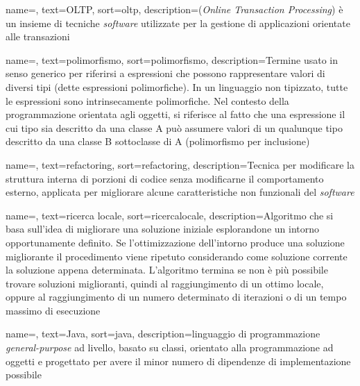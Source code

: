 {
    name=,
    text=OLTP,
    sort=oltp,
    description={(\textit{Online Transaction Processing}) è un insieme di tecniche \textit{software} utilizzate per
    la gestione di applicazioni orientate alle transazioni \cite{siteE:wiki}}
}

{
    name=,
    text=polimorfismo,
    sort=polimorfismo,
    description={Termine usato in senso generico
    per riferirsi a espressioni che possono rappresentare valori di diversi tipi (dette
    espressioni polimorfiche). In un linguaggio non tipizzato, tutte le espressioni
    sono intrinsecamente polimorfiche. Nel contesto della programmazione orientata
    agli oggetti, si riferisce al fatto che una espressione il cui tipo sia descritto da
    una classe A può assumere valori di un qualunque tipo descritto da una classe B
    sottoclasse di A (polimorfismo per inclusione) \cite{siteE:wiki}}
}

{
    name=,
    text=refactoring,
    sort=refactoring,
    description={Tecnica per modificare la struttura interna di porzioni di codice
    senza modificarne il comportamento esterno, applicata per migliorare alcune
    caratteristiche non funzionali del \textit{software} \cite{Ian-Sommerville:software-engineering}}
}

{
    name=,
    text=ricerca locale,
    sort=ricercalocale,
    description={Algoritmo che si basa sull’idea di migliorare
    una soluzione iniziale esplorandone un intorno
    opportunamente definito. Se l’ottimizzazione
    dell’intorno produce una soluzione migliorante
    il procedimento viene ripetuto
    considerando come soluzione corrente la soluzione
    appena determinata. L’algoritmo termina se non è più
    possibile trovare soluzioni miglioranti, quindi al
    raggiungimento di un ottimo locale, oppure al
    raggiungimento di un numero
    determinato di iterazioni o di un tempo massimo di esecuzione \cite{siteS:dispense-de-giovanni}}
}

{
    name=,
    text=Java,
    sort=java,
    description={linguaggio di programmazione
    \textit{general-purpose} ad livello, basato su classi, orientato alla programmazione ad oggetti e
    progettato
    per avere il minor numero di dipendenze di implementazione
    possibile \cite{siteE:wiki}}
}

